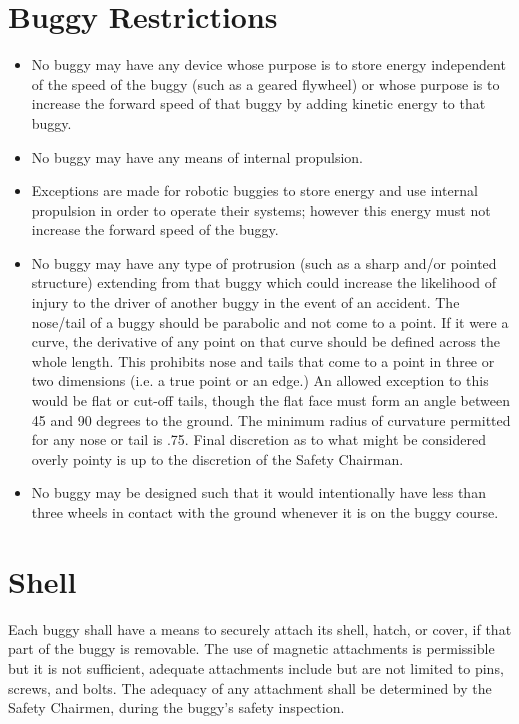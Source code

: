 \section{Buggy Restrictions}

	\begin{itemize}

		\item
		No buggy may have any device whose purpose is to store energy independent of the speed of the buggy (such as a geared flywheel) or whose purpose is to increase the forward speed of that buggy by adding kinetic energy to that buggy.

		\item
		No buggy may have any means of internal propulsion.

		\item
		Exceptions are made for robotic buggies to store energy and use internal propulsion in order to operate their systems; however this energy must not increase the forward speed of the buggy. 

		\item
		No buggy may have any type of protrusion (such as a sharp and/or pointed structure) extending from that buggy which could increase the likelihood of injury to the driver of another buggy in the event of an accident. The nose/tail of a buggy should be parabolic and not come to a point. If it were a curve, the derivative of any point on that curve should be defined across the whole length. This prohibits nose and tails that come to a point in three or two dimensions (i.e. a true point or an edge.) An allowed exception to this would be flat or cut-off tails, though the flat face must form an angle between 45 and 90 degrees to the ground. The minimum radius of curvature permitted for any nose or tail is .75. Final discretion as to what might be considered overly pointy is up to the discretion of the Safety Chairman.

		\item
		No buggy may be designed such that it would intentionally have less than three wheels in contact with the ground whenever it is on the buggy course.

	\end{itemize}

\section{Shell}

	Each buggy shall have a means to securely attach its shell, hatch, or cover, if that part of the buggy is removable. The use of magnetic attachments is permissible but it is not sufficient, adequate attachments include but are not limited to pins, screws, and bolts. The adequacy of any attachment shall be determined by the Safety Chairmen, during the buggy’s safety inspection.


